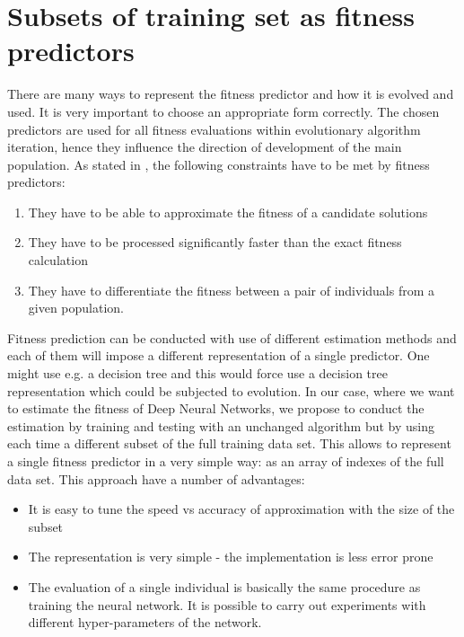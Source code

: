 \documentclass{llncs}
\begin{document}
\section{Subsets of training set as fitness predictors}

There are many ways to represent the fitness predictor and how it is evolved and used. It is very important to choose an appropriate form correctly. The chosen predictors are used for all fitness evaluations within evolutionary algorithm iteration, hence they influence the direction of development of the main population. As stated in \cite{Schmidt2006}, the following constraints have to be met by fitness predictors:

\begin{enumerate}

    \item They have to be able to approximate the fitness of a candidate solutions
    \item They have to be processed significantly faster than the exact fitness calculation
    \item They have to differentiate the fitness between a pair of individuals from a given population.

\end{enumerate}

Fitness prediction can be conducted with use of different estimation methods and each of them will impose a different representation of a single predictor. One might use e.g. a decision tree and this would force use a decision tree representation which could be subjected to evolution. In our case, where we want to estimate the fitness of Deep Neural Networks, we propose to conduct the estimation by training and testing with an unchanged algorithm but by using each time a different subset of the full training data set. This allows to represent a single fitness predictor in a very simple way: as an array of indexes of the full data set. This approach have a number of advantages:

\begin{itemize}

    \item It is easy to tune the speed vs accuracy of approximation with the size of the subset
    \item The representation is very simple - the implementation is less error prone
    \item The evaluation of a single individual is basically the same procedure as training the neural network. It is possible to carry out experiments with different hyper-parameters of the network.

\end{itemize}
\end{document}
